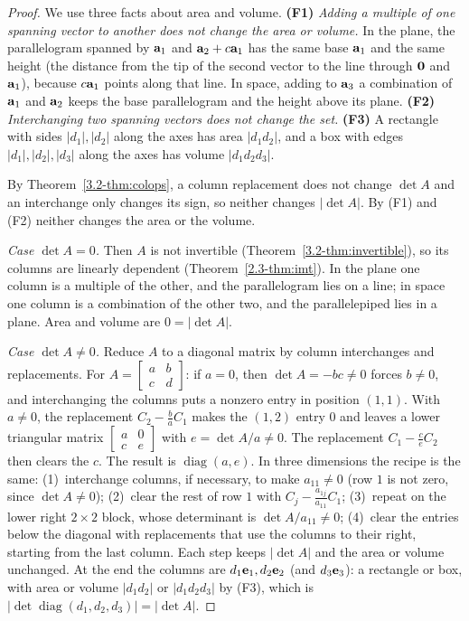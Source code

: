\documentclass[11pt]{article}
\begin{document}
\begin{proof}
We use three facts about area and volume. \textbf{(F1)} \emph{Adding a multiple of one spanning vector to another does not change the area or volume.} In the plane, the parallelogram spanned by $\mathbf{a}_1$ and $\mathbf{a}_2+c\mathbf{a}_1$ has the same base $\mathbf{a}_1$ and the same height (the distance from the tip of the second vector to the line through $\mathbf{0}$ and $\mathbf{a}_1$), because $c\mathbf{a}_1$ points along that line. In space, adding to $\mathbf{a}_3$ a combination of $\mathbf{a}_1$ and $\mathbf{a}_2$ keeps the base parallelogram and the height above its plane. \textbf{(F2)} \emph{Interchanging two spanning vectors does not change the set.} \textbf{(F3)} A rectangle with sides $|d_1|,|d_2|$ along the axes has area $|d_1d_2|$, and a box with edges $|d_1|,|d_2|,|d_3|$ along the axes has volume $|d_1d_2d_3|$.

By Theorem~\ref{3.2-thm:colops}, a column replacement does not change $\det A$ and an interchange only changes its sign, so neither changes $|\det A|$. By (F1) and (F2) neither changes the area or the volume.

\emph{Case $\det A=0$.} Then $A$ is not invertible (Theorem~\ref{3.2-thm:invertible}), so its columns are linearly dependent (Theorem~\ref{2.3-thm:imt}). In the plane one column is a multiple of the other, and the parallelogram lies on a line; in space one column is a combination of the other two, and the parallelepiped lies in a plane. Area and volume are $0=|\det A|$.

\emph{Case $\det A\neq0$.} Reduce $A$ to a diagonal matrix by column interchanges and replacements. For $A=\begin{bmatrix}a&b\\c&d\end{bmatrix}$: if $a=0$, then $\det A=-bc\neq0$ forces $b\neq0$, and interchanging the columns puts a nonzero entry in position $(1,1)$. With $a\neq0$, the replacement $C_2-\frac baC_1$ makes the $(1,2)$ entry $0$ and leaves a lower triangular matrix $\begin{bmatrix}a&0\\c&e\end{bmatrix}$ with $e=\det A/a\neq0$. The replacement $C_1-\frac ceC_2$ then clears the $c$. The result is $\operatorname{diag}(a,e)$. In three dimensions the recipe is the same: (1)~interchange columns, if necessary, to make $a_{11}\neq0$ (row $1$ is not zero, since $\det A\neq0$); (2)~clear the rest of row $1$ with $C_j-\frac{a_{1j}}{a_{11}}C_1$; (3)~repeat on the lower right $2\times2$ block, whose determinant is $\det A/a_{11}\neq0$; (4)~clear the entries below the diagonal with replacements that use the columns to their right, starting from the last column. Each step keeps $|\det A|$ and the area or volume unchanged. At the end the columns are $d_1\mathbf{e}_1,d_2\mathbf{e}_2$ (and $d_3\mathbf{e}_3$): a rectangle or box, with area or volume $|d_1d_2|$ or $|d_1d_2d_3|$ by (F3), which is $|\det\operatorname{diag}(d_1,d_2,d_3)|=|\det A|$.
\end{proof}
\end{document}
